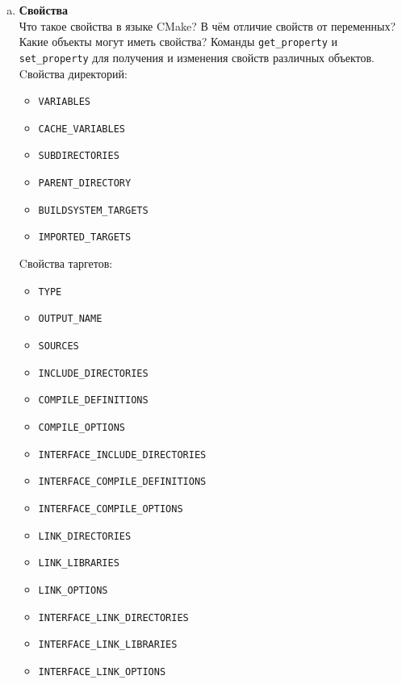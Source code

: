 \documentclass{article}
\begin{document}
\begin{enumerate}
\begin{enumerate}[a.]
\item \textbf{Свойства}\\
Что такое свойства в языке CMake? В чём отличие свойств от переменных? Какие объекты могут иметь свойства?
Команды \texttt{get\_property} и \texttt{set\_property} для получения и изменения свойств различных объектов.
Cвойства директорий:
\begin{itemize}
\item \texttt{VARIABLES}
\item \texttt{CACHE\_VARIABLES}
\item \texttt{SUBDIRECTORIES}
\item \texttt{PARENT\_DIRECTORY}
\item \texttt{BUILDSYSTEM\_TARGETS}
\item \texttt{IMPORTED\_TARGETS}
\end{itemize}

Cвойства таргетов:
\begin{multicols}{2}
\begin{itemize}
\item \texttt{TYPE}
\item \texttt{OUTPUT\_NAME}
\item \texttt{SOURCES}
\item \texttt{INCLUDE\_DIRECTORIES}
\item \texttt{COMPILE\_DEFINITIONS}
\item \texttt{COMPILE\_OPTIONS}
\item \texttt{INTERFACE\_INCLUDE\_DIRECTORIES}
\item \texttt{INTERFACE\_COMPILE\_DEFINITIONS}
\item \texttt{INTERFACE\_COMPILE\_OPTIONS}
\item \texttt{LINK\_DIRECTORIES}
\item \texttt{LINK\_LIBRARIES}
\item \texttt{LINK\_OPTIONS}
\item \texttt{INTERFACE\_LINK\_DIRECTORIES}
\item \texttt{INTERFACE\_LINK\_LIBRARIES}
\item \texttt{INTERFACE\_LINK\_OPTIONS}
\end{itemize}
\end{multicols}


\end{enumerate}
\end{enumerate}
\end{document}
